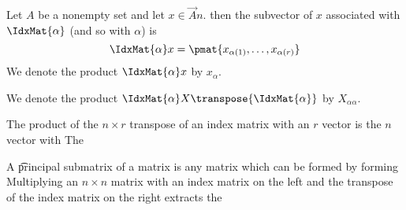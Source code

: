 Let $A$ be a nonempty set and let $x \in \Vec{A}{n}$.
then the subvector of $x$ associated with $\IdxMat{\alpha}$ (and so with $\alpha$) is
$$
  \IdxMat{\alpha}x = \pmat{x_{\alpha(1)}, \dots, x_{\alpha(r)}}
$$
We denote the product $\IdxMat{\alpha}x$ by $x_{\alpha}$.

We denote the product $\IdxMat{\alpha}X\transpose{\IdxMat{\alpha}}$ by $X_{\alpha\alpha}$.



The product of the $n \times r$ transpose of an index  matrix with an $r$ vector is the $n$ vector with
The

A \t{principal submatrix} of a matrix is any matrix which can be formed by forming Multiplying an $n \times n$ matrix with an index matrix on the left and the transpose of the index matrix on the right extracts the

\strats
